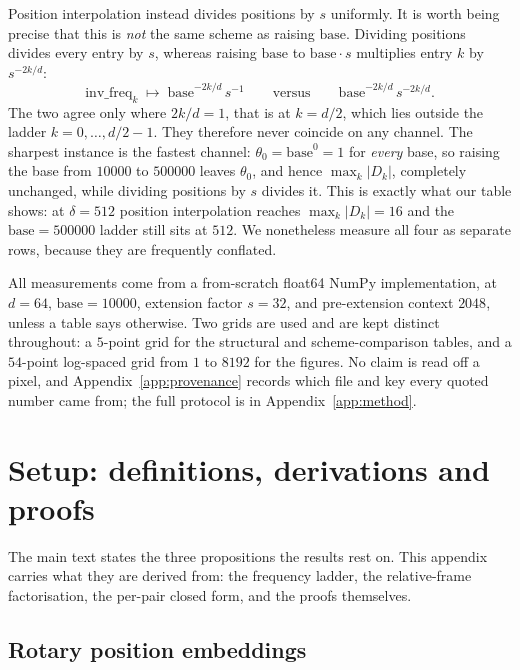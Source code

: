 \documentclass{article}
\theoremstyle{plain}
\theoremstyle{remark}
\begin{document}
Position interpolation \citep{chen2023positionalinterp} instead divides
positions by $s$ uniformly. It is worth being precise that this is
\emph{not} the same scheme as raising $\mathrm{base}$. Dividing positions
divides every entry by $s$, whereas raising $\mathrm{base}$ to
$\mathrm{base}\cdot s$ multiplies entry $k$ by $s^{-2k/d}$:
\[
  \mathrm{inv\_freq}_k \;\mapsto\; \mathrm{base}^{-2k/d}\,s^{-1}
  \qquad\text{versus}\qquad
  \mathrm{base}^{-2k/d}\,s^{-2k/d}.
\]
The two agree only where $2k/d = 1$, that is at $k = d/2$, which lies outside
the ladder $k = 0,\dots,d/2-1$. They therefore never coincide on any channel.
The sharpest instance is the fastest channel: $\theta_0 = \mathrm{base}^{0} = 1$
for \emph{every} base, so raising the base from $10000$ to $500000$ leaves
$\theta_0$, and hence $\max_k |D_k|$, completely unchanged, while dividing
positions by $s$ divides it. This is exactly what our table shows: at
$\delta = 512$ position interpolation reaches $\max_k|D_k| = 16$ and the
$\mathrm{base} = 500000$ ladder still sits at $512$. We nonetheless measure all
four as separate rows, because they are frequently conflated.

All measurements come from a from-scratch float64 NumPy implementation, at
$d = 64$, $\mathrm{base} = 10000$, extension factor $s = 32$, and pre-extension
context $2048$, unless a table says otherwise. Two grids are used and are kept
distinct throughout: a $5$-point grid for the structural and scheme-comparison
tables, and a $54$-point log-spaced grid from $1$ to $8192$ for the figures. No
claim is read off a pixel, and Appendix~\ref{app:provenance} records which file
and key every quoted number came from; the full protocol is in
Appendix~\ref{app:method}.


\section{Setup: definitions, derivations and proofs}
\label{app:setup}

The main text states the three propositions the results rest on. This appendix
carries what they are derived from: the frequency ladder, the relative-frame
factorisation, the per-pair closed form, and the proofs themselves.

\subsection{Rotary position embeddings}
\end{document}
